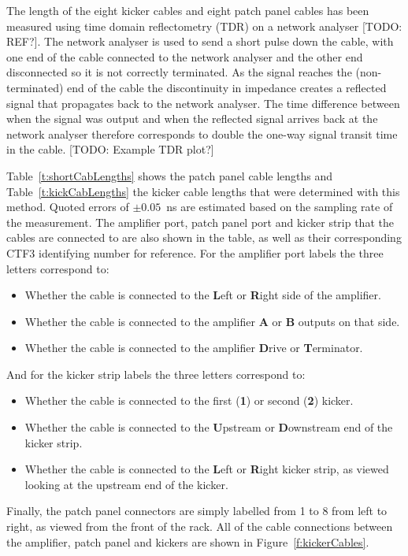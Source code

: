 The length of the eight kicker cables and eight patch panel cables has been measured using time domain reflectometry (TDR) on a network analyser [TODO: REF?]. The network analyser is used to send a short pulse down the cable,  with one end of the cable connected to the network analyser and the other end disconnected so it is not correctly terminated. As the signal reaches the (non-terminated) end of the cable the discontinuity in impedance creates a reflected signal that propagates back to the network analyser. The time difference between when the signal was output and when the reflected signal arrives back at the network analyser therefore corresponds to double the one-way signal transit time in the cable. [TODO: Example TDR plot?] 

Table~\ref{t:shortCabLengths} shows the patch panel cable lengths and Table~\ref{t:kickCabLengths} the kicker cable lengths that were determined with this method. Quoted errors of \(\pm0.05\)~ns are estimated based on the sampling rate of the measurement. The amplifier port, patch panel port and kicker strip that the cables are connected to are also shown in the table, as well as their corresponding CTF3 identifying number for reference. For the amplifier port labels the three letters correspond to:
\begin{itemize}
\item Whether the cable is connected to the \textbf{L}eft or \textbf{R}ight side of the amplifier.
\item  Whether the cable is connected to the amplifier \textbf{A} or \textbf{B} outputs on that side.
\item Whether the cable is connected to the amplifier \textbf{D}rive or \textbf{T}erminator.
\end{itemize}
And for the kicker strip labels the three letters correspond to:
\begin{itemize}
\item Whether the cable is connected to the first (\textbf{1}) or second (\textbf{2}) kicker.
\item  Whether the cable is connected to the \textbf{U}pstream or \textbf{D}ownstream end of the kicker strip.
\item Whether the cable is connected to the \textbf{L}eft or \textbf{R}ight kicker strip, as viewed looking at the upstream end of the kicker.
\end{itemize}
Finally, the patch panel connectors are simply labelled from 1 to 8 from left to right, as viewed from the front of the rack. All of the cable connections between the amplifier, patch panel and kickers are shown in Figure~\ref{f:kickerCables}.

